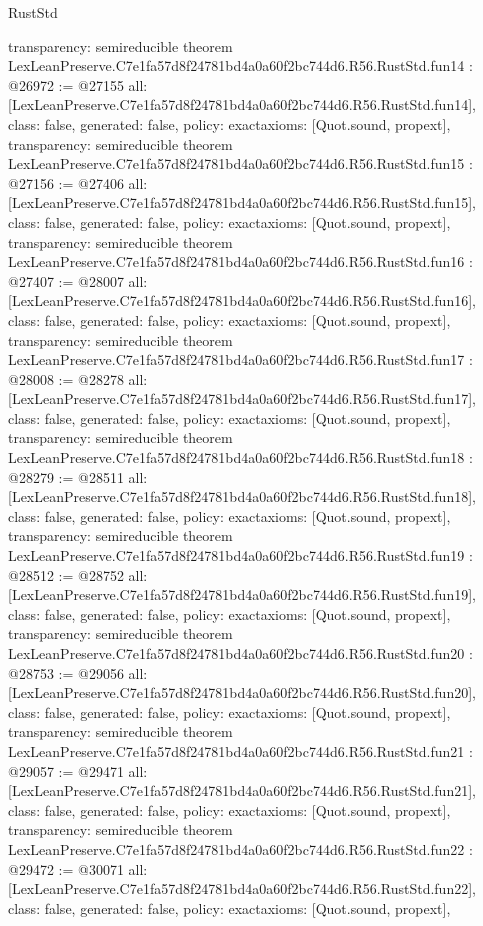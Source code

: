 \begin{lexlean}{RustStd}
\begin{coremodule}
{  transparency: semireducible
}
theorem LexLeanPreserve.C7e1fa57d8f24781bd4a0a60f2bc744d6.R56.RustStd.fun14 : @26972 := @27155 {
  all: [LexLeanPreserve.C7e1fa57d8f24781bd4a0a60f2bc744d6.R56.RustStd.fun14],
  class: false,
  generated: false,
  policy: exact{axioms: [Quot.sound, propext]},
  transparency: semireducible
}
theorem LexLeanPreserve.C7e1fa57d8f24781bd4a0a60f2bc744d6.R56.RustStd.fun15 : @27156 := @27406 {
  all: [LexLeanPreserve.C7e1fa57d8f24781bd4a0a60f2bc744d6.R56.RustStd.fun15],
  class: false,
  generated: false,
  policy: exact{axioms: [Quot.sound, propext]},
  transparency: semireducible
}
theorem LexLeanPreserve.C7e1fa57d8f24781bd4a0a60f2bc744d6.R56.RustStd.fun16 : @27407 := @28007 {
  all: [LexLeanPreserve.C7e1fa57d8f24781bd4a0a60f2bc744d6.R56.RustStd.fun16],
  class: false,
  generated: false,
  policy: exact{axioms: [Quot.sound, propext]},
  transparency: semireducible
}
theorem LexLeanPreserve.C7e1fa57d8f24781bd4a0a60f2bc744d6.R56.RustStd.fun17 : @28008 := @28278 {
  all: [LexLeanPreserve.C7e1fa57d8f24781bd4a0a60f2bc744d6.R56.RustStd.fun17],
  class: false,
  generated: false,
  policy: exact{axioms: [Quot.sound, propext]},
  transparency: semireducible
}
theorem LexLeanPreserve.C7e1fa57d8f24781bd4a0a60f2bc744d6.R56.RustStd.fun18 : @28279 := @28511 {
  all: [LexLeanPreserve.C7e1fa57d8f24781bd4a0a60f2bc744d6.R56.RustStd.fun18],
  class: false,
  generated: false,
  policy: exact{axioms: [Quot.sound, propext]},
  transparency: semireducible
}
theorem LexLeanPreserve.C7e1fa57d8f24781bd4a0a60f2bc744d6.R56.RustStd.fun19 : @28512 := @28752 {
  all: [LexLeanPreserve.C7e1fa57d8f24781bd4a0a60f2bc744d6.R56.RustStd.fun19],
  class: false,
  generated: false,
  policy: exact{axioms: [Quot.sound, propext]},
  transparency: semireducible
}
theorem LexLeanPreserve.C7e1fa57d8f24781bd4a0a60f2bc744d6.R56.RustStd.fun20 : @28753 := @29056 {
  all: [LexLeanPreserve.C7e1fa57d8f24781bd4a0a60f2bc744d6.R56.RustStd.fun20],
  class: false,
  generated: false,
  policy: exact{axioms: [Quot.sound, propext]},
  transparency: semireducible
}
theorem LexLeanPreserve.C7e1fa57d8f24781bd4a0a60f2bc744d6.R56.RustStd.fun21 : @29057 := @29471 {
  all: [LexLeanPreserve.C7e1fa57d8f24781bd4a0a60f2bc744d6.R56.RustStd.fun21],
  class: false,
  generated: false,
  policy: exact{axioms: [Quot.sound, propext]},
  transparency: semireducible
}
theorem LexLeanPreserve.C7e1fa57d8f24781bd4a0a60f2bc744d6.R56.RustStd.fun22 : @29472 := @30071 {
  all: [LexLeanPreserve.C7e1fa57d8f24781bd4a0a60f2bc744d6.R56.RustStd.fun22],
  class: false,
  generated: false,
  policy: exact{axioms: [Quot.sound, propext]},
}
\end{coremodule}
\end{lexlean}
